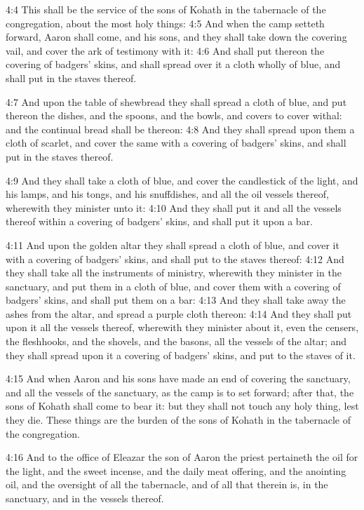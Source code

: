 4:4 This shall be the service of the sons of Kohath in the tabernacle
of the congregation, about the most holy things: 4:5 And when the camp
setteth forward, Aaron shall come, and his sons, and they shall take
down the covering vail, and cover the ark of testimony with it: 4:6
And shall put thereon the covering of badgers' skins, and shall spread
over it a cloth wholly of blue, and shall put in the staves thereof.

4:7 And upon the table of shewbread they shall spread a cloth of blue,
and put thereon the dishes, and the spoons, and the bowls, and covers
to cover withal: and the continual bread shall be thereon: 4:8 And
they shall spread upon them a cloth of scarlet, and cover the same
with a covering of badgers' skins, and shall put in the staves
thereof.

4:9 And they shall take a cloth of blue, and cover the candlestick of
the light, and his lamps, and his tongs, and his snuffdishes, and all
the oil vessels thereof, wherewith they minister unto it: 4:10 And
they shall put it and all the vessels thereof within a covering of
badgers' skins, and shall put it upon a bar.

4:11 And upon the golden altar they shall spread a cloth of blue, and
cover it with a covering of badgers' skins, and shall put to the
staves thereof: 4:12 And they shall take all the instruments of
ministry, wherewith they minister in the sanctuary, and put them in a
cloth of blue, and cover them with a covering of badgers' skins, and
shall put them on a bar: 4:13 And they shall take away the ashes from
the altar, and spread a purple cloth thereon: 4:14 And they shall put
upon it all the vessels thereof, wherewith they minister about it,
even the censers, the fleshhooks, and the shovels, and the basons, all
the vessels of the altar; and they shall spread upon it a covering of
badgers' skins, and put to the staves of it.

4:15 And when Aaron and his sons have made an end of covering the
sanctuary, and all the vessels of the sanctuary, as the camp is to set
forward; after that, the sons of Kohath shall come to bear it: but
they shall not touch any holy thing, lest they die. These things are
the burden of the sons of Kohath in the tabernacle of the
congregation.

4:16 And to the office of Eleazar the son of Aaron the priest
pertaineth the oil for the light, and the sweet incense, and the daily
meat offering, and the anointing oil, and the oversight of all the
tabernacle, and of all that therein is, in the sanctuary, and in the
vessels thereof.

